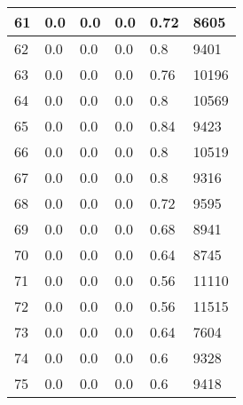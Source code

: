 \begin{longtable}{|l|l|l|l|l|l|}
61 & 0.0 & 0.0 & 0.0 & 0.72 & 8605 \\ \hline 
62 & 0.0 & 0.0 & 0.0 & 0.8 & 9401 \\ \hline 
63 & 0.0 & 0.0 & 0.0 & 0.76 & 10196 \\ \hline 
64 & 0.0 & 0.0 & 0.0 & 0.8 & 10569 \\ \hline 
65 & 0.0 & 0.0 & 0.0 & 0.84 & 9423 \\ \hline 
66 & 0.0 & 0.0 & 0.0 & 0.8 & 10519 \\ \hline 
67 & 0.0 & 0.0 & 0.0 & 0.8 & 9316 \\ \hline 
68 & 0.0 & 0.0 & 0.0 & 0.72 & 9595 \\ \hline 
69 & 0.0 & 0.0 & 0.0 & 0.68 & 8941 \\ \hline 
70 & 0.0 & 0.0 & 0.0 & 0.64 & 8745 \\ \hline 
71 & 0.0 & 0.0 & 0.0 & 0.56 & 11110 \\ \hline 
72 & 0.0 & 0.0 & 0.0 & 0.56 & 11515 \\ \hline 
73 & 0.0 & 0.0 & 0.0 & 0.64 & 7604 \\ \hline 
74 & 0.0 & 0.0 & 0.0 & 0.6 & 9328 \\ \hline 
75 & 0.0 & 0.0 & 0.0 & 0.6 & 9418 \\ \hline 
\end{longtable}